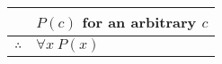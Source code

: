 \documentclass{standalone}
\begin{document}
\begin{tabular}{rl}
    & $P\left(c\right)$ for an arbitrary $c$ \\
    \hline
    $\therefore$ & $\forall x\ P\left(x\right)$    
\end{tabular}
\end{document}
